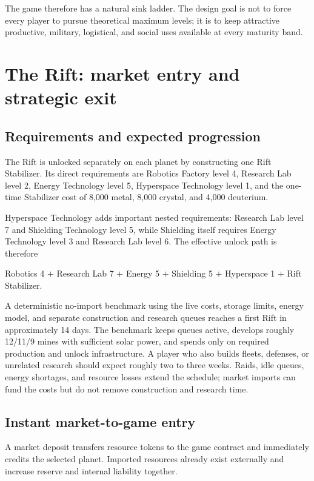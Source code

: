 \documentclass[11pt]{article}
\begin{document}
The game therefore has a natural sink ladder. The design goal is not to force every player to pursue theoretical maximum levels; it is to keep attractive productive, military, logistical, and social uses available at every maturity band.

\section{The Rift: market entry and strategic exit}

\subsection{Requirements and expected progression}

The Rift is unlocked separately on each planet by constructing one Rift Stabilizer. Its direct requirements are Robotics Factory level 4, Research Lab level 2, Energy Technology level 5, Hyperspace Technology level 1, and the one-time Stabilizer cost of 8,000 metal, 8,000 crystal, and 4,000 deuterium.

Hyperspace Technology adds important nested requirements: Research Lab level 7 and Shielding Technology level 5, while Shielding itself requires Energy Technology level 3 and Research Lab level 6. The effective unlock path is therefore

\begin{center}
Robotics 4 $+$ Research Lab 7 $+$ Energy 5 $+$ Shielding 5 $+$ Hyperspace 1 $+$ Rift Stabilizer.
\end{center}

A deterministic no-import benchmark using the live costs, storage limits, energy model, and separate construction and research queues reaches a first Rift in approximately 14 days. The benchmark keeps queues active, develops roughly 12/11/9 mines with sufficient solar power, and spends only on required production and unlock infrastructure. A player who also builds fleets, defenses, or unrelated research should expect roughly two to three weeks. Raids, idle queues, energy shortages, and resource losses extend the schedule; market imports can fund the costs but do not remove construction and research time.

\subsection{Instant market-to-game entry}

A market deposit transfers resource tokens to the game contract and immediately credits the selected planet. Imported resources already exist externally and increase reserve and internal liability together.
\end{document}
